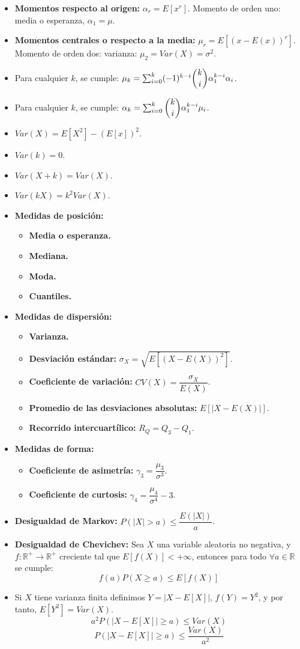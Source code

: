 \documentclass[oneside,spanish,a4paper]{article}
\begin{document}
\begin{itemize}
\item \textbf{Momentos respecto al origen:} $\alpha_r=E[x^r]$. Momento de orden uno: media o esperanza, $\alpha_1=\mu$.
\item \textbf{Momentos centrales o respecto a la media:} $\mu_r=E[(x-E(x))^r]$. Momento de orden dos: varianza: $\mu_2=Var(X)=\sigma^2$.
\item Para cualquier $k$, se cumple: $\mu_k=\sum_{i=0}^k(-1)^{k-i}\dbinom{k}{i}\alpha_1^{k-i}\alpha_i$.
\item Para cualquier $k$, se cumple: $\alpha_k=\sum_{i=0}^k\dbinom{k}{i}\alpha_1^{k-i}\mu_i$.
\item $Var(X)=E[X^2]-(E[x])^2$.
\item $Var(k)=0$.
\item $Var(X+k)=Var(X)$.
\item $Var(kX)=k^2Var(X)$.
\item \textbf{Medidas de posici\'on:}
\begin{itemize}
\item \textbf{Media o esperanza.}
\item \textbf{Mediana.}
\item \textbf{Moda.}
\item \textbf{Cuantiles.}
\end{itemize}
\item \textbf{Medidas de dispersi\'on:}
\begin{itemize}
\item \textbf{Varianza.}
\item \textbf{Desviaci\'on est\'andar:} $\sigma_X=\sqrt{E[(X-E(X))^2]}$.
\item \textbf{Coeficiente de variaci\'on:} $CV(X)=\dfrac{\sigma_X}{E(X)}$.
\item \textbf{Promedio de las desviaciones absolutas:} $E[|X-E(X)|]$.
\item \textbf{Recorrido intercuart\'ilico:} $R_Q=Q_3-Q_1$.
\end{itemize}\item \textbf{Medidas de forma:}
\begin{itemize}
\item \textbf{Coeficiente de asimetr\'ia:} $\gamma_3=\dfrac{\mu_3}{\sigma^3}$.
\item \textbf{Coeficiente de curtosis:} $\gamma_4=\dfrac{\mu_4}{\sigma^4}-3$.
\end{itemize}
\item \textbf{Desigualdad de Markov:} $P(|X|>a)\leq \dfrac{E(|X|)}{a}$.
\item \textbf{Desigualdad de Chevichev:} Sea $X$ una variable aleatoria no negativa, y $f:\mathbb{R}^+\to\mathbb{R}^+$ creciente tal que $E[f(X)]<+\infty$, entonces para todo $\forall a\in\mathbb{R}$ se cumple:
\[f(a)P(X\geq a)\leq E[f(X)]\]
\item Si $X$ tiene varianza finita definimos $Y=|X-E[X]|$, $f(Y)=Y^2$, y por tanto, $E[Y^2]=Var(X)$.
\[a^2P(|X-E[X]|\geq a)\leq Var(X)\]
\[P(|X-E[X]|\geq a)\leq\dfrac{Var(X)}{a^2}\]
\end{itemize}
\end{document}
